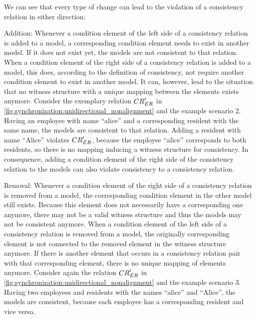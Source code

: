 We can see that every type of change can lead to the violation of a consistency relation in either direction:
\begin{properdescription}
    \item[Addition:] Whenever a condition element of the left side of a consistency relation is added to a model, a corresponding condition element needs to exist in another model. If it does not exist yet, the models are not consistent to that relation.
    When a condition element of the right side of a consistency relation is added to a model, this does, according to the definition of consistency, not require another condition element to exist in another model. It can, however, lead to the situation that no witness structure with a unique mapping between the elements exists anymore.
    Consider the exemplary relation $\consistencyrelation{CR}{ER}'$ in \autoref{fig:synchronization:unidirectional_nonalignment} and the example scenario 2.
    Having an employee with name \enquote{alice} and a corresponding resident with the same name, the models are consistent to that relation.
    Adding a resident with name \enquote{Alice} violates $\consistencyrelation{CR}{ER}'$, because the employee \enquote{alice} corresponds to both residents, so there is no mapping inducing a witness structure for consistency.
    In consequence, adding a condition element of the right side of the consistency relation to the models can also violate consistency to a consistency relation.
    \item[Removal:] Whenever a condition element of the right side of a consistency relation is removed from a model, the corresponding condition element in the other model still exists. Because this element does not necessarily have a corresponding one anymore, there may not be a valid witness structure and thus the models may not be consistent anymore.
    When a condition element of the left side of a consistency relation is removed from a model, the originally corresponding element is not connected to the removed element in the witness structure anymore. If there is another element that occurs in a consistency relation pair with that corresponding element, there is no unique mapping of elements anymore.
    Consider again the relation $\consistencyrelation{CR}{ER}'$ in \autoref{fig:synchronization:unidirectional_nonalignment} and the example scenario 3.
    Having two employees and residents with the names \enquote{alice} and \enquote{Alice}, the models are consistent, because each employee has a corresponding resident and vice versa.

\end{properdescription}

